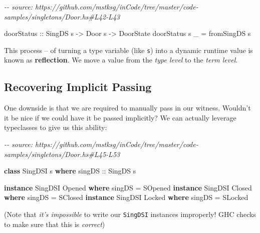 \documentclass[]{article}
\newenvironment{Shaded}{}{}
\newcommand{\CommentTok}[1]{\textcolor[rgb]{0.38,0.63,0.69}{\textit{#1}}}
\newcommand{\DataTypeTok}[1]{\textcolor[rgb]{0.56,0.13,0.00}{#1}}
\newcommand{\KeywordTok}[1]{\textcolor[rgb]{0.00,0.44,0.13}{\textbf{#1}}}
\newcommand{\NormalTok}[1]{#1}
\newcommand{\OtherTok}[1]{\textcolor[rgb]{0.00,0.44,0.13}{#1}}
\begin{document}
\begin{Shaded}
\begin{Highlighting}[]
\CommentTok{{-}{-} source: https://github.com/mstksg/inCode/tree/master/code{-}samples/singletons/Door.hs\#L42{-}L43}

\OtherTok{doorStatus ::} \DataTypeTok{SingDS}\NormalTok{ s }\OtherTok{{-}>} \DataTypeTok{Door}\NormalTok{ s }\OtherTok{{-}>} \DataTypeTok{DoorState}
\NormalTok{doorStatus s \_ }\OtherTok{=}\NormalTok{ fromSingDS s}
\end{Highlighting}
\end{Shaded}

This process -- of turning a type variable (like \texttt{s}) into a dynamic
runtime value is known as \textbf{reflection}. We move a value from the
\emph{type level} to the \emph{term level}.

\hypertarget{recovering-implicit-passing}{%
\subsection{Recovering Implicit Passing}\label{recovering-implicit-passing}}

One downside is that we are required to manually pass in our witness. Wouldn't
it be nice if we could have it be passed implicitly? We can actually leverage
typeclasses to give us this ability:

\begin{Shaded}
\begin{Highlighting}[]
\CommentTok{{-}{-} source: https://github.com/mstksg/inCode/tree/master/code{-}samples/singletons/Door.hs\#L45{-}L53}

\KeywordTok{class} \DataTypeTok{SingDSI}\NormalTok{ s }\KeywordTok{where}
\OtherTok{    singDS ::} \DataTypeTok{SingDS}\NormalTok{ s}

\KeywordTok{instance} \DataTypeTok{SingDSI} \DataTypeTok{\textquotesingle{}Opened} \KeywordTok{where}
\NormalTok{    singDS }\OtherTok{=} \DataTypeTok{SOpened}
\KeywordTok{instance} \DataTypeTok{SingDSI} \DataTypeTok{\textquotesingle{}Closed} \KeywordTok{where}
\NormalTok{    singDS }\OtherTok{=} \DataTypeTok{SClosed}
\KeywordTok{instance} \DataTypeTok{SingDSI} \DataTypeTok{\textquotesingle{}Locked} \KeywordTok{where}
\NormalTok{    singDS }\OtherTok{=} \DataTypeTok{SLocked}
\end{Highlighting}
\end{Shaded}

(Note that \emph{it's impossible} to write our \texttt{SingDSI} instances
improperly! GHC checks to make sure that this is \emph{correct})
\end{document}
